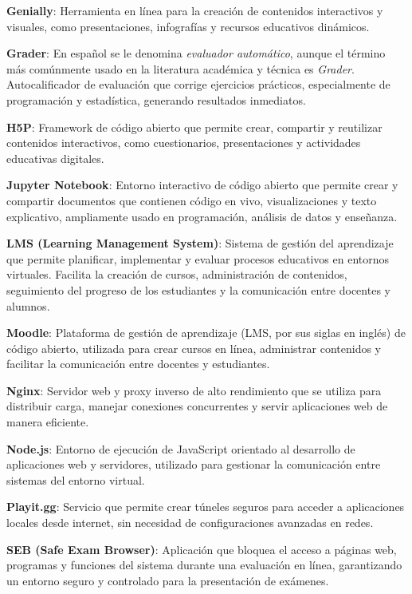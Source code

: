 \documentclass[letter,oneside,12pt,spanish]{report}
\begin{document}
\begin{description}
\item \textbf{Genially}: Herramienta en línea para la creación de contenidos interactivos y visuales, como presentaciones, infografías y recursos educativos dinámicos.
\item \textbf{Grader}: En español se le denomina \textit{evaluador automático}, aunque el término más comúnmente usado en la literatura académica y técnica es \textit{Grader}. Autocalificador de evaluación que corrige ejercicios prácticos, especialmente de programación y estadística, generando resultados inmediatos. 
\item \textbf{H5P}: Framework de código abierto que permite crear, compartir y reutilizar contenidos interactivos, como cuestionarios, presentaciones y actividades educativas digitales.
\item \textbf{Jupyter Notebook}: Entorno interactivo de código abierto que permite crear y compartir documentos que contienen código en vivo, visualizaciones y texto explicativo, ampliamente usado en programación, análisis de datos y enseñanza.
\item \textbf{LMS (Learning Management System)}: Sistema de gestión del aprendizaje que permite planificar, implementar y evaluar procesos educativos en entornos virtuales. Facilita la creación de cursos, administración de contenidos, seguimiento del progreso de los estudiantes y la comunicación entre docentes y alumnos.
\item \textbf{Moodle}: Plataforma de gestión de aprendizaje (LMS, por sus siglas en inglés) de código abierto, utilizada para crear cursos en línea, administrar contenidos y facilitar la comunicación entre docentes y estudiantes.
\item \textbf{Nginx}: Servidor web y proxy inverso de alto rendimiento que se utiliza para distribuir carga, manejar conexiones concurrentes y servir aplicaciones web de manera eficiente.
\item \textbf{Node.js}: Entorno de ejecución de JavaScript orientado al desarrollo de aplicaciones web y servidores, utilizado para gestionar la comunicación entre sistemas del entorno virtual.
\item \textbf{Playit.gg}: Servicio que permite crear túneles seguros para acceder a aplicaciones locales desde internet, sin necesidad de configuraciones avanzadas en redes.
\item \textbf{SEB (Safe Exam Browser)}: Aplicación que bloquea el acceso a páginas web, programas y funciones del sistema durante una evaluación en línea, garantizando un entorno seguro y controlado para la presentación de exámenes.
\end{description}
\end{document}
